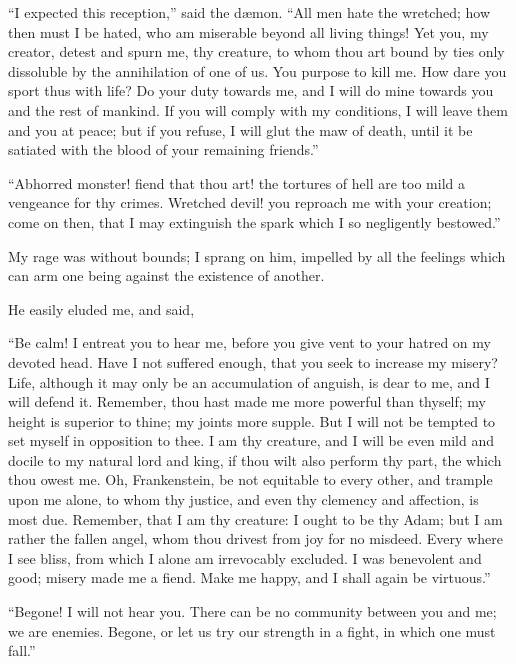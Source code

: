 ``I expected this reception,'' said the
dæmon. ``All men hate the wretched;
how then must I be hated, who am miserable
beyond all living things! Yet
you, my creator, detest and spurn me,
thy creature, to whom thou art bound by
ties only dissoluble by the annihilation
of one of us. You purpose to kill me.
How dare you sport thus with life?
Do your duty towards me, and I will
do mine towards you and the rest of
mankind. If you will comply with my
conditions, I will leave them and you
at peace; but if you refuse, I will glut
the maw of death, until it be satiated
with the blood of your remaining
friends.''

``Abhorred monster! fiend that
thou art! the tortures of hell are too
mild a vengeance for thy crimes.
Wretched devil! you reproach me with
your creation; come on then, that I
may extinguish the spark which I so
negligently bestowed.''

My rage was without bounds; I
sprang on him, impelled by all the
feelings which can arm one being
against the existence of another.

He easily eluded me, and said,

``Be calm! I entreat you to hear me,
before you give vent to your hatred on
my devoted head. Have I not suffered
enough, that you seek to increase my
misery? Life, although it may only be
an accumulation of anguish, is dear to
me, and I will defend it. Remember,
thou hast made me more powerful than
thyself; my height is superior to thine;
my joints more supple. But I will not
be tempted to set myself in opposition
to thee. I am thy creature, and I will
be even mild and docile to my natural
lord and king, if thou wilt also perform
thy part, the which thou owest me.
Oh, Frankenstein, be not equitable to
every other, and trample upon me
alone, to whom thy justice, and even
thy clemency and affection, is most
due. Remember, that I am thy creature:
I ought to be thy Adam; but I
am rather the fallen angel, whom thou
drivest from joy for no misdeed. Every
where I see bliss, from which I alone
am irrevocably excluded. I was benevolent
and good; misery made me a
fiend. Make me happy, and I shall
again be virtuous.''

``Begone! I will not hear you.
There can be no community between
you and me; we are enemies. Begone,
or let us try our strength in a fight, in
which one must fall.''

